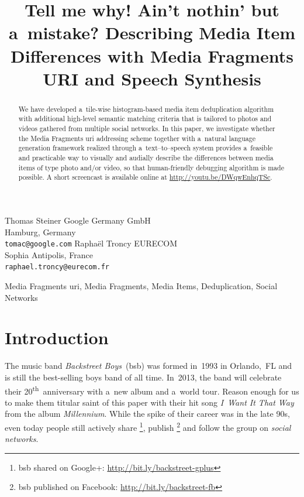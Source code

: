 \documentclass{article}
\begin{document}
\sloppy

\newcommand{\ts}{\textsuperscript}

\title{Tell me why! Ain't nothin' but a~mistake? Describing Media Item Differences with Media Fragments URI and Speech Synthesis}

\twoauthors
  {Thomas Steiner}
	{Google Germany GmbH\\
	Hamburg, Germany\\
    \texttt{tomac@google.com}}
  {Raphaël Troncy}
	{EURECOM\\
    Sophia Antipolis, France\\
	\texttt{raphael.troncy@eurecom.fr}}

\maketitle


\begin{abstract}
We have developed a~tile-wise histogram-based media item deduplication algorithm with additional high-level semantic matching criteria that is tailored to photos and videos gathered from multiple social networks. In this paper, we investigate whether the Media Fragments {\sc uri} addressing scheme together with a~natural language generation framework realized through a~text--to--speech system provides a~feasible and practicable way to visually and audially describe the differences between media items of type photo and/or video, so that human-friendly debugging algorithm is made possible. A short screencast is available online at \url{http://youtu.be/DWqwEnhqTSc}.
\end{abstract}

\begin{keywords}
Media Fragments {\sc uri}, Media Fragments, Media Items, Deduplication, Social Networks
\end{keywords}


\section{Introduction}
\label{sec:introduction}
The music band \emph{Backstreet Boys}~({\sc bsb}) was formed in~1993 in Orlando,~FL and is still the best-selling boys band of all time. In~2013, the band will celebrate their 20\ts{th}~anniversary with a~new album and a~world tour. Reason enough for us to make them titular saint of this paper with their hit song \emph{I~Want It That Way} from the album \emph{Millennium}. While the spike of their career was in the late 90s, even today people still actively share
\footnote{{\sc bsb} shared on Google+: \url{http://bit.ly/backstreet-gplus}}, publish \footnote{{\sc bsb} published on Facebook: \url{http://bit.ly/backstreet-fb}} and follow the group on \emph{social networks}.
\end{document}
